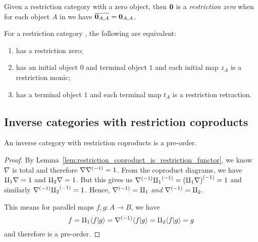 \begin{definition}\label{def:restriction_zero}
  Given a restriction category \X with a zero object, then $\mathbf{0}$ is a \emph{restriction zero} when
  for each object $A$ in \X we have $\overline{\mathbf{0}_{A,A}} = \mathbf{0}_{A,A}$.
\end{definition}

\begin{lemma}\label{lem:restriction_zero_equivalences}
  For a restriction category \X, the following are equivalent:
  \begin{enumerate}[{(}i{)}]
    \item \X has a restriction zero;
    \item \X has an initial object $0$ and terminal object $1$ and each initial map $z_A$ is a
      restriction monic;
    \item \X has a terminal object $1$ and each terminal map $t_A$ is a restriction retraction.
  \end{enumerate}
\end{lemma}




\subsection{Inverse categories with restriction coproducts} %
\label{sub:inverse_categories_with_restriction_coproducts}


\begin{proposition}\label{prop:inverse_category_with_coproducts_is_pre-order}
  An inverse category \X with restriction coproducts is a pre-order.
\end{proposition}
\begin{proof}
  By Lemma~\ref{lem:restriction_coproduct_is_restriction_functor}, we know $\nabla$ is total and
  therefore $\nabla{\nabla}^{(-1)} = 1$. From the coproduct diagrams, we have $\amalg_{1}\nabla =1$ and
  $\amalg_{2}\nabla = 1$. But this gives us ${\nabla}^{(-1)}{\amalg_{1}}^{(-1)} = {(\amalg_{1}\nabla)}^{(-1)} = 1$ and
  similarly ${\nabla}^{(-1)}{\amalg_{2}}^{(-1)} =1$. Hence, ${\nabla}^{(-1)} = \amalg_{1}$ \emph{and} ${\nabla}^{(-1)} =
  \amalg_{2}$.

  This means for parallel maps $f,g:A \to B$, we have
  \[
    f = \amalg_{1} \langle f|g\rangle = {\nabla}^{(-1)} \langle f|g\rangle = \amalg_{2}\langle f|g\rangle = g
  \]
  and therefore \X is a pre-order.
\end{proof}

